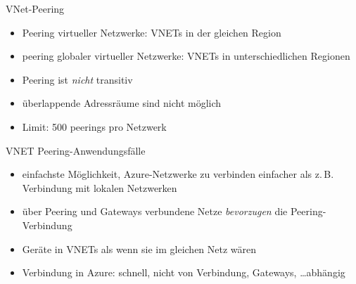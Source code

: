 

\begin{flashcard}[Definition]{VNet-Peering}
    \begin{itemize}
        \item Peering virtueller Netzwerke: VNETs in der gleichen Region
        \item peering globaler virtueller Netzwerke: VNETs in unterschiedlichen Regionen
        \item Peering ist \emph{nicht} transitiv
        \item überlappende Adressräume sind nicht möglich
        \item Limit: 500 peerings pro Netzwerk
    \end{itemize}
\end{flashcard}

\begin{flashcard}[Definition]{VNET Peering-Anwendungsfälle}
    \begin{itemize}
        \item einfachste Möglichkeit, Azure-Netzwerke zu verbinden\newline
            einfacher als z.\,B. Verbindung mit lokalen Netzwerken
        \item über Peering und Gateways verbundene Netze \emph{bevorzugen} die Peering-Verbindung
        \item Geräte in VNETs als wenn sie im gleichen Netz wären
        \item Verbindung in Azure: schnell, nicht von Verbindung, Gateways, \ldots abhängig
    \end{itemize}
\end{flashcard}

